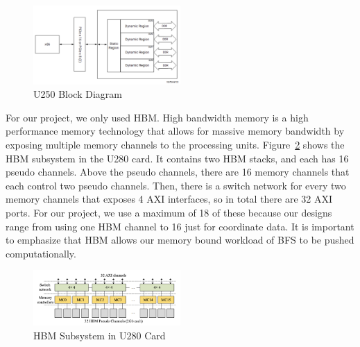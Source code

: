 \documentclass[10pt]{article}
\begin{document}
\begin{figure}[h!]
  \centering
  \includegraphics[width=0.5\textwidth]{u250.png}
  \caption{U250 Block Diagram}
  \label{fig:u250}
\end{figure}

\noindent For our project, we only used HBM. High bandwidth memory is a high performance memory technology that 
allows for massive memory bandwidth by exposing multiple memory channels to the processing units. Figure~\ref{fig:hbm} 
shows the HBM subsystem in the U280 card. It contains two HBM stacks, and each has 16 pseudo channels. Above the pseudo 
channels, there are 16 memory channels that each control two pseudo channels. Then, there is a switch network for 
every two memory channels that exposes 4 AXI interfaces, so in total there are 32 AXI ports. For our project, we 
use a maximum of 18 of these because our designs range from using one HBM channel to 16 just for coordinate data. 
It is important to emphasize that HBM allows our memory bound workload of BFS to be pushed computationally. 

\begin{figure}[h!]
  \centering
  \includegraphics[width=0.5\textwidth]{hbm.png}
  \caption{HBM Subsystem in U280 Card}
  \label{fig:hbm}
\end{figure}
\end{document}
